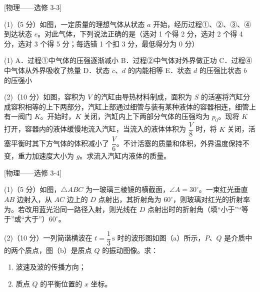 \begin{question}
[物理——选修 3-3]

(1)（5 分）如图，一定质量的理想气体从状态 $a$ 开始，经历过程①、②、③、④到达状态 $e$。对此气体，下列说法正确的是\gkblank（选对 1 个得 2 分，选对 2 个得 4 分，选对 3 个得 5 分；每选错 1 个扣 3 分，最低得分为 0 分）


\begin{gkopts}(1)
  \task A．过程①中气体的压强逐渐减小
  \task B．过程②中气体对外界做正功
  \task C．过程④中气体从外界吸收了热量
  \task D．状态 $c$、$d$ 的内能相等
  \task E．状态 $d$ 的压强比状态 $b$ 的压强小
\end{gkopts}

(2)（10 分）如图，容积为 $V$ 的汽缸由导热材料制成，面积为 $S$ 的活塞将汽缸分成容积相等的上下两部分，汽缸上部通过细管与装有某种液体的容器相连，细管上有一阀门 $K$。开始时，$K$ 关闭，汽缸内上下两部分气体的压强均为 $p_{0}$。现将 $K$ 打开，容器内的液体缓慢地流入汽缸，当流入的液体体积为 $\dfrac{V}{8}$ 时，将 $K$ 关闭，活塞平衡时其下方气体的体积减小了 $\dfrac{V}{6}$。不计活塞的质量和体积，外界温度保持不变，重力加速度大小为 $g$。求流入汽缸内液体的质量。

\end{question}

\begin{question}
[物理——选修 3-4]

(1)（5 分）如图，$\triangle ABC$ 为一玻璃三棱镜的横截面，$\angle A=30^{\circ}$。一束红光垂直 $AB$ 边射入，从 $AC$ 边上的 $D$ 点射出，其折射角为 $60^{\circ}$，则玻璃对红光的折射率为\gkblank。若改用蓝光沿同一路径入射，则光线在 $D$ 点射出时的折射角\gkblank（填“小于”“等于”或“大于”）$60^{\circ}$。


(2)（10 分）一列简谐横波在 $t=\dfrac{1}{3}\,\si{\second}$ 时的波形图如图（a）所示，$P$、$Q$ 是介质中的两个质点，图（b）是质点 $Q$ 的振动图像。求：
\begin{enumerate}[leftmargin=2em, label=(\roman*)]
  \item 波速及波的传播方向；
  \item 质点 $Q$ 的平衡位置的 $x$ 坐标。
\end{enumerate}

\end{question}
